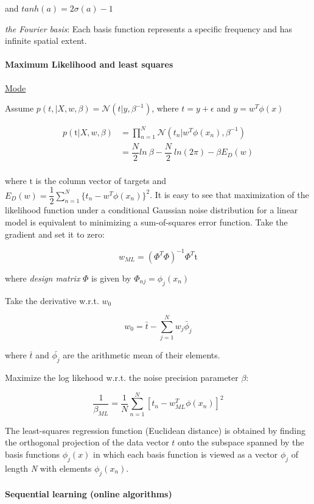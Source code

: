 \documentclass[]{article}
\let\oldparagraph\paragraph
\renewcommand{\paragraph}[1]{\oldparagraph{#1}\mbox{}}
\begin{document}
and \(tanh(a)=2\sigma(a)-1\)

\emph{the Fourier basis}: Each basis function represents a specific
frequency and has infinite spatial extent.

\paragraph{Maximum Likelihood and least squares}\label{header-n34}

\href{https://en.wikipedia.org/wiki/Mode_(statistics)}{Mode}

Assume \(p(t,|X,w,\beta)=\mathcal{N}(t|y,\beta^{-1})\), where
\(t=y+\epsilon\) and \(y=w^T\phi(x)\)

\begin{align}
p(\mathrm{t}|X,w,\beta)&=\prod\limits^{N}_{n=1}\mathcal{N}(t_n|w^T\phi(x_n),\beta^{-1})\\
&=\dfrac{N}{2}ln\ \beta-\dfrac{N}{2}\ ln(2\pi)-\beta E_D(w)\\
\end{align}

where \(\mathrm{t}\) is the column vector of targets and
\(E_D(w)=\dfrac{1}{2}\sum\limits^N_{n=1}\{t_n-w^T\phi(x_n)\}^2\). It is
easy to see that maximization of the likelihood function under a
conditional Gaussian noise distribution for a linear model is equivalent
to minimizing a sum-of-squares error function. Take the gradient and set
it to zero:

\[w_{ML}=(\Phi^T\Phi)^{-1}\Phi^T\mathrm{t}\]

where \emph{design matrix} \(\Phi\) is given by
\(\Phi_{nj}=\phi_j(x_n)\)

Take the derivative w.r.t. \(w_0\)

\[w_0=\bar{t}-\sum\limits^N_{j=1}w_j\bar{\phi}_j\]

where \(\bar{t}\) and \(\bar{\phi_j}\) are the arithmetic mean of their
elements.

Maximize the log likehood w.r.t. the noise precision parameter
\(\beta\):

\[\dfrac{1}{\beta_{ML}}=\dfrac{1}{N}\sum\limits^N_{n=1}[t_n-w^T_{ML}\phi(x_n)]^2\]

The least-squares regression function (Euclidean distance) is obtained
by finding the orthogonal projection of the data vector \(t\) onto the
subspace spanned by the basis functions \(\phi_j(x)\) in which each
basis function is viewed as a vector \(\phi_j\) of length \emph{N} with
elements \(\phi_j(x_n)\).

\paragraph{Sequential learning (online algorithms)}\label{header-n55}
\end{document}
